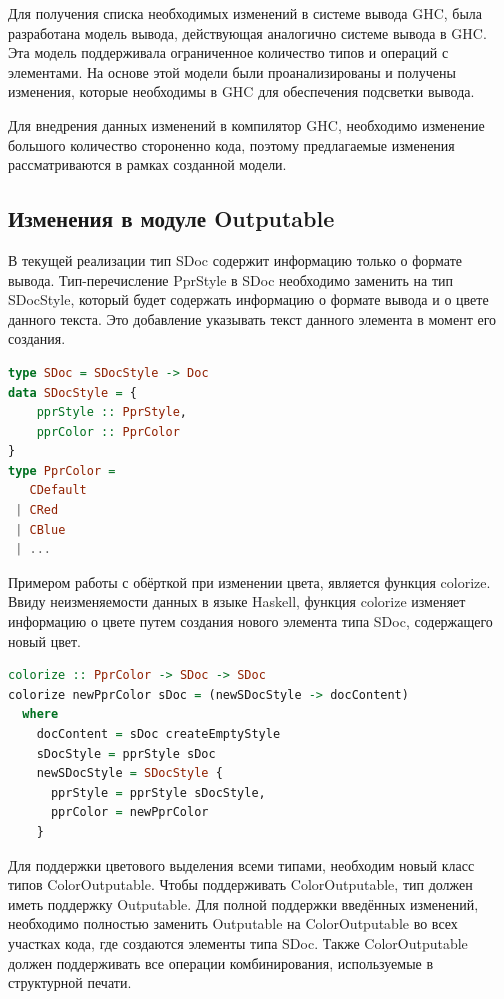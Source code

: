 Для получения списка необходимых изменений в системе вывода GHC, была разработана модель вывода, действующая аналогично системе вывода в GHC. Эта модель поддерживала ограниченное количество типов и операций с элементами. На основе этой модели были проанализированы и получены изменения, которые необходимы в GHC для обеспечения подсветки вывода.

Для внедрения данных изменений в компилятор GHC, необходимо изменение большого количество стороненно кода, поэтому предлагаемые изменения рассматриваются в рамках созданной модели.

\subsection{Изменения в модуле Outputable}

В текущей реализации тип SDoc содержит информацию только о формате вывода. Тип-перечисление PprStyle в SDoc необходимо заменить на тип SDocStyle, который будет содержать информацию о формате вывода и о цвете данного текста. Это добавление указывать текст данного элемента в момент его создания.

\begin{lstlisting}[language=Haskell, caption=Дополненная реализация типа SDoc]
type SDoc = SDocStyle -> Doc
data SDocStyle = {
    pprStyle :: PprStyle,
    pprColor :: PprColor
}
type PprColor =
   CDefault
 | CRed
 | CBlue
 | ...
\end{lstlisting}

Примером работы с обёрткой при изменении цвета, является функция colorize. Ввиду неизменяемости данных в языке Haskell, функция colorize изменяет информацию о цвете путем создания нового элемента типа SDoc, содержащего новый цвет.

\begin{lstlisting}[language=Haskell, caption=Пример функции окраски]
colorize :: PprColor -> SDoc -> SDoc
colorize newPprColor sDoc = (newSDocStyle -> docContent)
  where 
    docContent = sDoc createEmptyStyle
    sDocStyle = pprStyle sDoc  
    newSDocStyle = SDocStyle { 
      pprStyle = pprStyle sDocStyle, 
      pprColor = newPprColor 
    }
\end{lstlisting}

Для поддержки цветового выделения всеми типами, необходим новый класс типов ColorOutputable. Чтобы поддерживать ColorOutputable, тип должен иметь поддержку Outputable. Для полной поддержки введённых изменений, необходимо полностью заменить Outputable на ColorOutputable во всех участках кода, где создаются элементы типа SDoc. Также ColorOutputable должен поддерживать все операции комбинирования, используемые в структурной печати.

